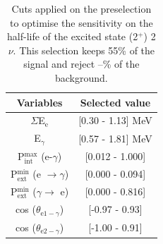 \documentclass[main.tex]{subfiles}
\begin{document}
\begin{table}[h!]
\centering
\begin{tabular}{c|c}
Variables & Selected value \\
\toprule
$\Sigma$E$_{\text{e}}$ & [0.30 - 1.13] MeV \\
E$_{\gamma}$    & [0.57 - 1.81] MeV \\
P$_{\text{int}}^{\text{max}}$ (e-$\gamma$) & [0.012 - 1.000] \\
P$_{\text{ext}}^{\text{min}}$ (e $\rightarrow \gamma$) & [0.000 - 0.094] \\
P$_{\text{ext}}^{\text{min}}$ ($\gamma \rightarrow$ e) & [0.000 - 0.816] \\
cos ($\theta_{\text{e1}-\gamma}$) & [-0.97 - 0.93] \\
cos ($\theta_{\text{e2}-\gamma}$) & [-1.00 - 0.91] \\
\bottomrule
\end{tabular}
\caption{Cuts applied on the preselection to optimise the sensitivity on the half-life of the excited state (2$^+$) 2$\nu$. This selection keeps 55\% of the signal and reject --\% of the background.}
\label{tab:Cuts2nu2Plus150keV}
\end{table}
\end{document}

